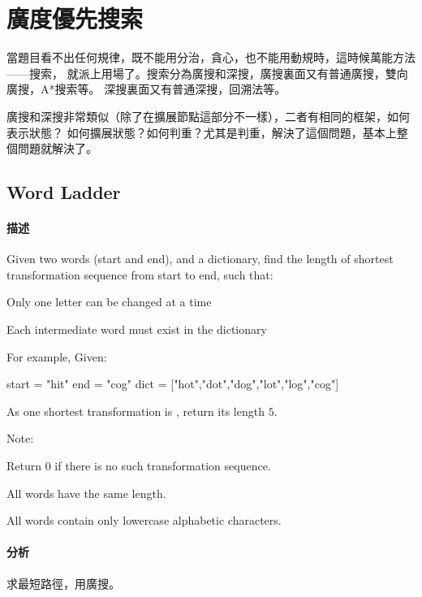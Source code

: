 \chapter{廣度優先搜索}
當題目看不出任何規律，既不能用分治，貪心，也不能用動規時，這時候萬能方法——搜索，
就派上用場了。搜索分為廣搜和深搜，廣搜裏面又有普通廣搜，雙向廣搜，A*搜索等。
深搜裏面又有普通深搜，回溯法等。

廣搜和深搜非常類似（除了在擴展節點這部分不一樣），二者有相同的框架，如何表示狀態？
如何擴展狀態？如何判重？尤其是判重，解決了這個問題，基本上整個問題就解決了。
\newline


\section{Word Ladder} %
\label{sec:word-ladder}


\subsubsection{描述}
Given two words (start and end), and a dictionary, find the length of shortest transformation sequence from start to end, such that:
\begindot
\item Only one letter can be changed at a time
\item Each intermediate word must exist in the dictionary
\myenddot

For example, Given:

\begin{Code}
start = "hit"
end = "cog"
dict = ["hot","dot","dog","lot","log","cog"]
\end{Code}
As one shortest transformation is , return its length $5$.

Note:
\begindot
\item Return 0 if there is no such transformation sequence.
\item All words have the same length.
\item All words contain only lowercase alphabetic characters.
\myenddot


\subsubsection{分析}
求最短路徑，用廣搜。


